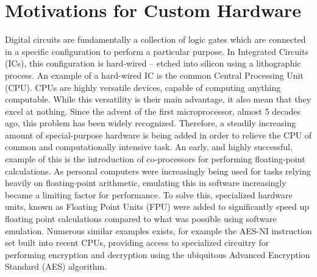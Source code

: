 \section{Motivations for Custom Hardware}






Digital circuits are fundamentally a collection of logic gates which are
connected in a specific configuration to perform a particular purpose. In
Integrated Circuits (ICs), this configuration is hard-wired -- etched into
silicon using a lithographic process. An example of a hard-wired IC is the
common Central Processing Unit (CPU). CPUs are highly versatile devices, capable
of computing anything computable. While this versatility is their main
advantage, it also mean that they excel at nothing.
Since the advent of the first microprocessor, almost 5 decades ago, this problem
has been widely recognized. Therefore, a steadily increasing amount of
special-purpose hardware is being added in order to relieve the CPU of common
and computationally intensive task. An early, and highly successful, example of
this is the introduction of co-processors for performing floating-point
calculations. As personal computers were increasingly being used for tasks
relying heavily on floating-point arithmetic, emulating this in software
increasingly became a limiting factor for performance. To solve this,
specialized hardware units, known as Floating Point Units (FPU) were added to
significantly speed up floating point calculations compared to what was possible
using software emulation. Numerous similar examples exists, for example the
AES-NI instruction set built into recent CPUs, providing access to specialized
circuitry for performing encryption and decryption using the ubiquitous Advanced
Encryption Standard (AES) algorithm.

